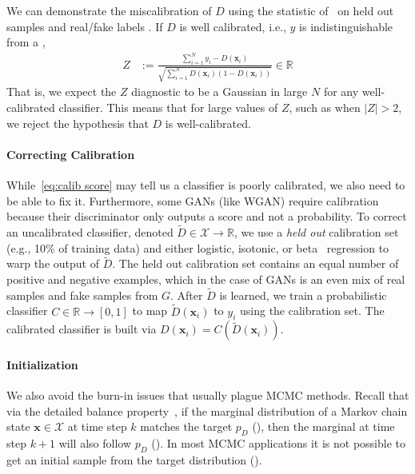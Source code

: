 \documentclass{article}
\renewcommand{\vec}[1]{{\boldsymbol{\mathbf{#1}}}} %
\newcommand{\R}{\mathbb{R}}
\newcommand{\set}[1]{\mathcal{#1}}
\newcommand{\sample}{\sim}
\newcommand{\norm}{\mathcal{N}}
\newcommand{\bern}{\textrm{Bern}}
\newcommand{\PD}{{p_D}}
\newcommand{\setx}{\set{X}}
\begin{document}
We can demonstrate the miscalibration of $D$ using the statistic of~\citet{Dawid1997} on held out samples \smash{$\vec x_{1:N}$} and real/fake labels .
If $D$ is well calibrated, i.e., $y$ is indistinguishable from a \smash{$y \sample \bern(D(\vec x))$},
\begin{align}
  Z &:= \frac{\sum_{i=1}^N y_i - D(\vec x_i)}{\sqrt{\sum_{i=1}^N D(\vec x_i) (1 - D(\vec x_i))}} \in \R \label{eq:calib score}
\end{align}
That is, we expect the $Z$ diagnostic to be a Gaussian in large $N$ for any well-calibrated classifier.
This means that for large values of $Z$, such as when $|Z| > 2$, we reject the hypothesis that $D$ is well-calibrated.

\paragraph{Correcting Calibration}
While~\eqref{eq:calib score} may tell us a classifier is poorly calibrated, we also need to be able to fix it.
Furthermore, some GANs (like WGAN) require calibration because their discriminator only outputs a score and not a probability.
To correct an uncalibrated classifier, denoted $\tilde{D} \in \setx \rightarrow \R$, we use a \emph{held out} calibration set (e.g., 10\% of training data) and either logistic, isotonic, or beta~\citep{Kull2017} regression to warp the output of $\tilde{D}$.
The held out calibration set contains an equal number of positive and negative examples, which in the case of GANs is an even mix of real samples and fake samples from $G$.
After $\tilde{D}$ is learned, we train a probabilistic classifier $C \in \R \rightarrow [0,1]$ to map $\tilde{D}(\vec x_i)$ to $y_i$ using the calibration set.
The calibrated classifier is built via $D(\vec x_i) = C(\tilde{D}(\vec x_i))$.

\paragraph{Initialization}
We also avoid the burn-in issues that usually plague MCMC methods.
Recall that via the detailed balance property~\citep[Ch.~1]{Gilks1996}, if the marginal distribution of a Markov chain state $\vec x \in \setx$ at time step $k$ matches the target $\PD$ (\smash{$\vec x_k \sample \PD$}), then the marginal at time step $k+1$ will also follow $\PD$ (\smash{$\vec x_{k+1} \sample \PD$})\@.
In most MCMC applications it is not possible to get an initial sample from the target distribution (\smash{$\vec x_0 \sample \PD$})\@.
\end{document}
